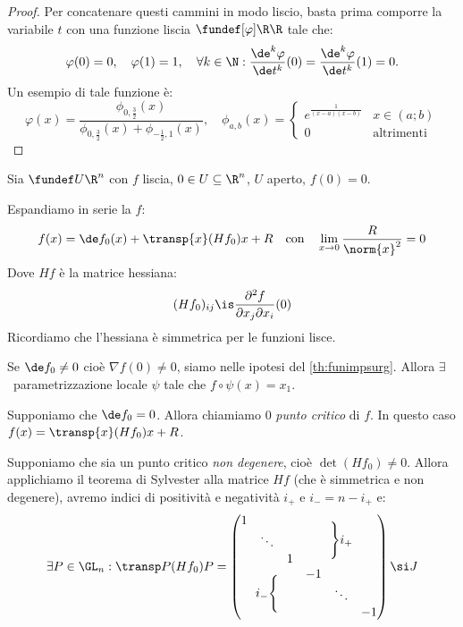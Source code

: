 \begin{proof}
	Per concatenare questi cammini in modo liscio,
	basta prima comporre la variabile $t$ con una funzione liscia $\fundef[\varphi]\R\R$ tale che:
	\[\varphi(0)=0, \quad
	\varphi(1)=1, \quad
	\forall k\in\N:\frac{\de^k\varphi}{\de t^k}(0)=\frac{\de^k\varphi}{\de t^k}(1)=0.\]
	Un esempio di tale funzione è:
	\[\varphi(x)=\frac{\phi_{0,\frac32}(x)}{\phi_{0,\frac32}(x)+\phi_{-\frac12,1}(x)},\quad
	\phi_{a,b}(x)=\begin{cases}
		e^{\frac1{(x-a)(x-b)}} & x\in(a;b) \\
		0 & \text{altrimenti}
	\end{cases}\]
\end{proof}

Sia $\fundef U{\R^n}$ con $f$ liscia, $0\in U\subseteq\R^n$, $U$ aperto, $f(0)=0$.

Espandiamo in serie la $f$:
\[f(x)=
\de f_{0}(x)+\transp{x}(Hf_{0})x+R
\quad\text{con}\quad
\lim_{x\to0}\frac R{\norm{x}^2}=0\]
Dove $Hf$ è la matrice hessiana:
\[(Hf_{0})_{ij}\is
\frac{\partial^2f}{\partial x_j\partial x_i}(0)\]
Ricordiamo che l'hessiana è simmetrica per le funzioni lisce.

Se $\de f_{0}\neq0$ cioè $\nabla f(0)\neq0$, siamo nelle ipotesi del \autoref{th:funimpsurg}. Allora $\exists$~parametrizzazione locale $\psi$ tale che $f\circ\psi(x)=x_1$.

Supponiamo che $\de f_{0}=0$. Allora chiamiamo $0$ \emph{punto critico} di $f$. In questo caso $f(x)=\transp{x}(Hf_{0})x+R$.

Supponiamo che sia un punto critico \emph{non degenere}, cioè $\det(Hf_{0})\neq0$. Allora applichiamo il teorema di Sylvester alla matrice $Hf$ (che è simmetrica e non degenere), avremo indici di positività e negatività $i_+$ e $i_-=n-i_+$ e:
\[\exists P\in\GL_n:
\transp P(Hf_{0})P=
\begin{pmatrix}
	\begin{matrix}
		1 & & \\
		& \ddots & \\
		& & 1 \\
	\end{matrix} & \Bigg\}i_+ \\
	i_-\Bigg\{ & \begin{matrix}
		-1 & & \\
		& \ddots & \\
		& & -1 \\
	\end{matrix}
\end{pmatrix}\si J\]

